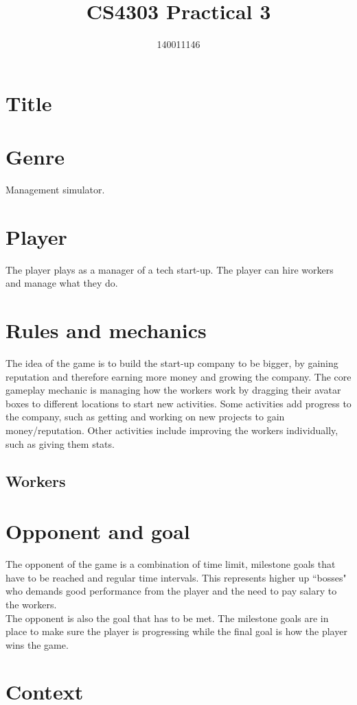 \documentclass[11pt]{article}
\author{140011146}
\title{CS4303 Practical 3}
\newcommand{\n}[0]{\\[\baselineskip]}
\begin{document}
\maketitle



\section{Title}

\section{Genre}
Management simulator.

\section{Player}
The player plays as a manager of a tech start-up. The player can hire workers and manage what they do.


\section{Rules and mechanics}
The idea of the game is to build the start-up company to be bigger, by gaining reputation and therefore earning more money and growing the company. The core gameplay mechanic is managing how the workers work by dragging their avatar boxes to different locations to start new activities. Some activities add progress to the company, such as getting and working on new projects to gain money/reputation. Other activities include improving the workers individually, such as giving them stats. 
\n
\subsection{Workers}

\section{Opponent and goal}
The opponent of the game is a combination of time limit, milestone goals  that have to be reached and regular time intervals. This represents higher up ``bosses" who demands good performance from the player and the need to pay salary to the workers. 
\n
The opponent is also the goal that has to be met. The milestone goals are in place to make sure the player is progressing while the final goal is how the player wins the game. 


\section{Context}
\end{document}
